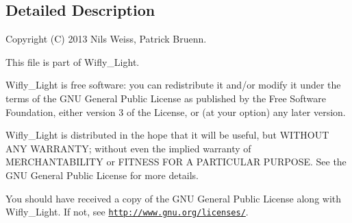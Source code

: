 \subsection{Detailed Description}
\begin{DoxyVerb}Copyright (C) 2013 Nils Weiss, Patrick Bruenn.
\end{DoxyVerb}


This file is part of Wifly\-\_\-\-Light.

Wifly\-\_\-\-Light is free software\-: you can redistribute it and/or modify it under the terms of the G\-N\-U General Public License as published by the Free Software Foundation, either version 3 of the License, or (at your option) any later version.

Wifly\-\_\-\-Light is distributed in the hope that it will be useful, but W\-I\-T\-H\-O\-U\-T A\-N\-Y W\-A\-R\-R\-A\-N\-T\-Y; without even the implied warranty of M\-E\-R\-C\-H\-A\-N\-T\-A\-B\-I\-L\-I\-T\-Y or F\-I\-T\-N\-E\-S\-S F\-O\-R A P\-A\-R\-T\-I\-C\-U\-L\-A\-R P\-U\-R\-P\-O\-S\-E. See the G\-N\-U General Public License for more details.

You should have received a copy of the G\-N\-U General Public License along with Wifly\-\_\-\-Light. If not, see \href{http://www.gnu.org/licenses/}{\tt http\-://www.\-gnu.\-org/licenses/}. 

